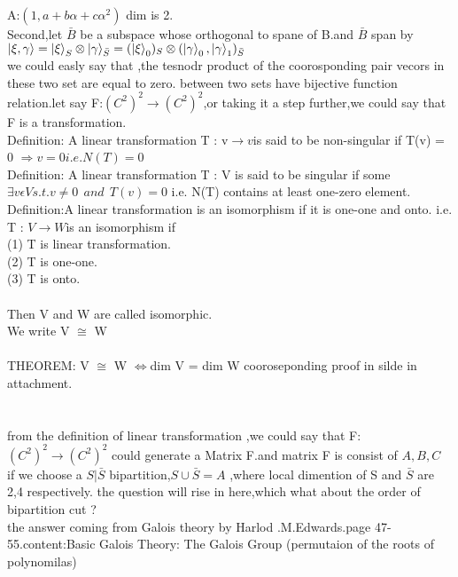 \documentclass[12pt,twoside]{report}
\begin{document}
  \\
  A:$(1,a+b\alpha+c\alpha^{2})$ dim is 2.
  \\  
  Second,let $\bar{B}$ be a subspace whose orthogonal to spane of B.and $\bar{B}$ span by $ \ket{\xi,\gamma}= \ket{\xi}_{S}\otimes\ket{\gamma}_{\bar{S}}=(\ket{\xi}_{0})_{S}\otimes(\Ket{\gamma}_{0},\ket{\gamma}_{1})_{\bar{S}}$
  \\
  we could easly say that ,the  tesnodr product  of the  coorosponding pair vecors in these two set are equal to zero.
 between two sets have bijective function relation.let say F:$ (C^{2})^{2} \longrightarrow (C^{2})^{2} $,or taking it a step further,we could say that F is a transformation.\\
 Definition: A linear transformation T : v$ \longrightarrow v $is said to be non-singular if T(v) = 0 $ \Rightarrow v = 0  i.e. N(T) = {0}  $ 
 \\
 Definition: A linear transformation T : V is said to be
 singular if  some $ \exists    v  \epsilon   V s.t. v\neq 0   \ \ and \ \ T(v) = 0 $ i.e. N(T) contains at least one-zero element. 
  \\
  Definition:A linear transformation is an isomorphism if it
  is one-one and onto.
  i.e. T : $V \longrightarrow W$is an isomorphism if\\
  (1) T is linear transformation.\\
  (2) T is one-one.\\
  (3) T is onto.\\
  \\
  Then V and W are called isomorphic.\\
  We write V $ \cong $ W\\
  \\
  THEOREM: V $ \cong $ W $ \Leftrightarrow $dim V = dim W
  cooroseponding proof in  silde in attachment.\\
  \\
  \\
  from the definition of linear transformation ,we could say that F:$ (C^{2})^{2} \longrightarrow (C^{2})^{2} $ could generate a Matrix F.and matrix F is consist of $ A,B,C $\\
  if we choose a $ S| \bar{S} $ bipartition,$ S\cup \bar{S} =A$ ,where local dimention of S and $ \bar{S} $ are 2,4 respectively.  
  the question will rise in here,which what about the order of bipartition cut ?
 \\
 the answer coming from Galois theory by Harlod .M.Edwards.page 47-55.content:Basic Galois Theory: The Galois Group (permutaion of the roots of polynomilas)
\end{document}
